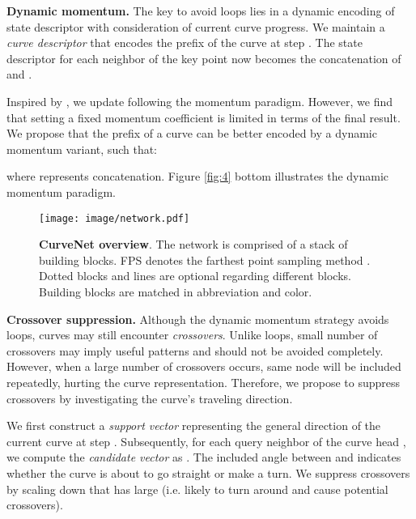 \documentclass[10pt,twocolumn,letterpaper]{article}
\theoremstyle{definition}
\begin{document}
\noindent
\textbf{Dynamic momentum.} The key to avoid loops lies in a dynamic encoding of state descriptor with consideration of current curve progress. We maintain a \textit{curve descriptor}  that encodes the prefix of the curve at step . The state descriptor  for each neighbor of the key point  now becomes the concatenation of  and .

Inspired by \cite{ioffe2015batch}, we update  following the momentum paradigm. However, we find that setting a fixed momentum coefficient  is limited in terms of the final result. We propose that the prefix  of a curve can be better encoded by a dynamic momentum variant, such that:

where  represents concatenation. Figure \ref{fig:4} bottom illustrates the dynamic momentum paradigm.




\begin{figure*}[t]
	\begin{center}
\texttt{[image: image/network.pdf]}
	\end{center}
	\caption{\textbf{CurveNet overview}. The network is comprised of a stack of building blocks. FPS denotes the farthest point sampling method \cite{qi2017pointnet++}. Dotted blocks and lines are optional regarding different blocks. Building blocks are matched in abbreviation and color.}
	\label{fig:network}
\end{figure*}

\noindent
\textbf{Crossover suppression.} Although the dynamic momentum strategy avoids loops, curves may still encounter \textit{crossovers}. Unlike loops, small number of crossovers may imply useful patterns and should not be avoided completely. However, when a large number of crossovers occurs, same node will be included repeatedly, hurting the curve representation. Therefore, we propose to suppress crossovers by investigating the curve's traveling direction. 

We first construct a \textit{support vector}  representing the general direction of the current curve at step . Subsequently, for each query neighbor of the curve head , we compute the \textit{candidate vector} as . The included angle  between  and  indicates whether the curve is about to go straight or make a turn. We suppress crossovers by scaling down  that has large  (i.e. likely to turn around and cause potential crossovers).
\end{document}
